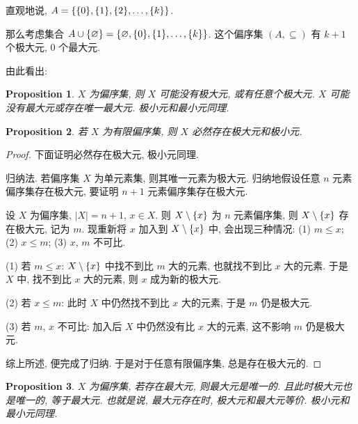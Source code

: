 \documentclass[UTF8]{ctexart}
\theoremstyle{mystyle}
\newtheorem{proposition}{Proposition}[section]
\theoremstyle{myremark}
\theoremstyle{plain}
\DeclarePairedDelimiter\set{\{}{\}}
\begin{document}
直观地说, $ A = \set{\set{0}, \set{1}, \set{2}, \dots, \set{k}} $.

那么考虑集合 $ A \cup \set{\varnothing} = \set{\varnothing, \set{0}, \set{1}, \dots, \set{k}} $. 这个偏序集 $ (A, \subseteq) $ 有 $ k + 1 $ 个极大元, $ 0 $ 个最大元.

由此看出:

\begin{proposition}
    $ X $ 为偏序集, 则 $ X $ 可能没有极大元, 或有任意个极大元. $ X $ 可能没有最大元或存在唯一最大元. 极小元和最小元同理.
\end{proposition}

\begin{proposition}
    若 $ X $ 为有限偏序集, 则 $ X $ 必然存在极大元和极小元.
\end{proposition}

\begin{proof}
    下面证明必然存在极大元, 极小元同理.

    归纳法. 若偏序集 $ X $ 为单元素集, 则其唯一元素为极大元. 归纳地假设任意 $ n $ 元素偏序集存在极大元, 要证明 $ n + 1 $ 元素偏序集存在极大元.

    设 $ X $ 为偏序集, $ |X| = n + 1 $, $ x \in X $. 则 $ X \setminus \set{x} $ 为 $ n $ 元素偏序集, 则 $ X \setminus \set{x} $ 存在极大元, 记为 $ m $. 现重新将 $ x $ 加入到 $ X \setminus \set{x} $ 中, 会出现三种情况: (1) $ m \le x $; (2) $ x \le m $; (3) $ x $, $ m $ 不可比.

    (1) 若 $ m \le x $: $ X \setminus \set{x} $ 中找不到比 $ m $ 大的元素, 也就找不到比 $ x $ 大的元素. 于是 $ X $ 中, 找不到比 $ x $ 大的元素, 则 $ x $ 成为新的极大元.

    (2) 若 $ x \le m $: 此时 $ X $ 中仍然找不到比 $ x $ 大的元素, 于是 $ m $ 仍是极大元.

    (3) 若 $ m $, $ x $ 不可比: 加入后 $ X $ 中仍然没有比 $ x $ 大的元素, 这不影响 $ m $ 仍是极大元.

    综上所述, 便完成了归纳. 于是对于任意有限偏序集, 总是存在极大元的.
\end{proof}

\begin{proposition}
    $ X $ 为偏序集, 若存在最大元, 则最大元是唯一的. 且此时极大元也是唯一的, 等于最大元. 也就是说, 最大元存在时, 极大元和最大元等价. 极小元和最小元同理.
\end{proposition}
\end{document}
